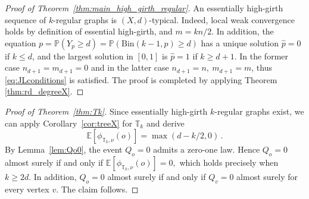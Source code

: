 \documentclass[reqno,english]{amsart}
\numberwithin{equation}{section}
\theoremstyle{definition}{
\newtheorem{example}[theorem]{Example}
\newtheorem{definition}[theorem]{Definition}
\newtheorem*{definition*}{Definition}
\newtheorem{problem}[theorem]{Problem}
\newtheorem{question}[theorem]{Question}
}
\newcommand{\E}{\mathbb E}
\renewcommand{\P}{\mathbb P}
\newcommand{\bbT}{\mathbb T}
\begin{document}
\begin{proof}[Proof of Theorem~\ref{thm:main_high_girth_regular}]
An essentially high-girth sequence of \(k\)-regular graphs is $(X,d)$-typical. Indeed, local weak convergence holds by definition of essential high-girth, and $m=kn/2$. In addition, the equation
$p=\P(Y_p\ge d) =\P(\mathrm{Bin}(k-1,p)\ge d)$ has a unique solution $\hat p=0$ if $k\le d$, and the largest solution in $[0,1]$ is $\hat p=1$ if $k\ge d+1$. In the former case $n_{d+1}=m_{d+1}=0$ and in the latter case $n_{d+1}=n,~m_{d+1}=m$, thus \eqref{eq:JLconditions} is satisfied. The proof is completed by applying Theorem \ref{thm:rd_degreeX}.
\end{proof}

\begin{proof}[Proof of Theorem~\ref{thm:Tk}]
Since essentially high-girth $k$-regular graphs exist, we can apply Corollary~\ref{cor:treeX} for $\bbT_k$ and derive
\[
 \E[\phi_{\bbT_k,\nu}(o)]=\max(d-k/2,0)\,.
\]
By Lemma~\ref{lem:Qo0}, the event \(Q_o=0\) admits a zero-one law. Hence
\(Q_o=0\) almost surely if and only if
\(
    \E[\phi_{\bbT_k,\nu}(o)]=0,
\)
which holds precisely when \(k\ge 2d\).
In addition, \(Q_o=0\) almost surely if and only if \(Q_v=0\) almost surely
for every vertex \(v\). The claim follows.
\end{proof}
\end{document}
